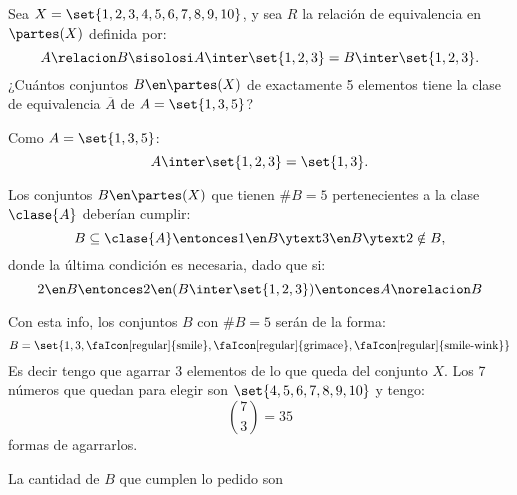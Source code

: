 \begin{enunciado}{\ejercicio}
  Sea $X = \set{1,2,3,4,5,6,7,8,9,10}$, y sea $R$ la relación de equivalencia en $\partes(X)$ definida por:
  $$
    A \relacion B \sisolosi A \inter \set{1,2,3} = B \inter \set{1,2,3}.
  $$
  ¿Cuántos conjuntos $B \en \partes(X)$ de exactamente 5 elementos tiene la clase de equivalencia $\overline A $ de $A = \set{1,3,5}$?
\end{enunciado}

Como $A = \set{1,3,5}$:
$$
  A \inter \set{1,2,3} = \set{1,3}.
$$

Los conjuntos $B \en \partes(X)$ que tienen $\#B = 5$ pertenecientes a la clase $\clase{A}$
deberían cumplir:
$$
  B \subseteq \clase{A}
  \entonces
  1 \en B
  \ytext
  3 \en B
  \ytext
  2 \notin B,
$$
donde la última condición es necesaria, dado que si:
$$
  2 \en B
  \entonces
  2 \en (B \inter \set{1,2,3})
  \entonces
  A \norelacion B
$$

Con esta info, los conjuntos $B$ con $\#B = 5$ serán de la forma:
$$
  B = \set{ 1, 3, \text{\faIcon[regular]{smile}}, \text{\faIcon[regular]{grimace}}, \text{\faIcon[regular]{smile-wink}} }
$$
Es decir tengo que agarrar 3 elementos de lo que queda del conjunto $X$.
Los 7 números que quedan para elegir son $\set{4,5,6,7,8,9,10}$ y tengo:
$$
  \binom{7}{3} = 35
$$
formas de agarrarlos.

La cantidad de $B$ que cumplen lo pedido son 

\begin{aportes}
  \item {}
\end{aportes}
